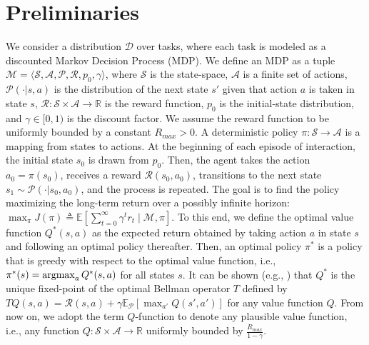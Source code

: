 \documentclass{article}
\newcommand{\argmax}{\operatornamewithlimits{argmax}}
\begin{document}
\section{Preliminaries}

We consider a distribution $\mathcal{D}$ over tasks, where each task is modeled as a discounted Markov Decision Process (MDP). We define an MDP as a tuple $\mathcal{M} = \langle \mathcal{S},\mathcal{A},\mathcal{P},\mathcal{R},p_0,\gamma\rangle$, where $\mathcal{S}$ is the state-space, $\mathcal{A}$ is a finite set of actions, $\mathcal{P}(\cdot | s,a)$ is the distribution of the next state $s'$ given that action $a$ is taken in state $s$, $\mathcal{R}: \mathcal{S}\times\mathcal{A}\rightarrow\mathbb{R}$ is the reward function, $p_0$ is the initial-state distribution, and $\gamma\in [0,1)$ is the discount factor. We assume the reward function to be uniformly bounded by a constant $R_{max}>0$. A deterministic policy $\pi : \mathcal{S} \rightarrow \mathcal{A}$ is a mapping from states to actions. At the beginning of each episode of interaction, the initial state $s_0$ is drawn from $p_0$. Then, the agent takes the action $a_0 = \pi(s_0)$, receives a reward $\mathcal{R}(s_0,a_0)$, transitions to the next state $s_1 \sim \mathcal{P}(\cdot | s_0,a_0)$, and the process is repeated. The goal is to find the policy maximizing the long-term return over a possibly infinite horizon: $\max_{\pi}J(\pi)\triangleq\mathbb{E}[\sum_{t=0}^{\infty} \gamma^t r_t \mid \mathcal{M},\pi]$. To this end, we define the optimal value function $Q^*(s,a)$ as the expected return obtained by taking action $a$ in state $s$ and following an optimal policy thereafter. Then, an optimal policy $\pi^*$ is a policy that is greedy with respect to the optimal value function, i.e., $\pi^*(s) = \argmax_a Q^*(s,a)$ for all states $s$. It can be shown (e.g., \cite{puterman1994markov}) that $Q^*$ is the unique fixed-point of the optimal Bellman operator $T$ defined by $TQ(s,a) = \mathcal{R}(s,a) + \gamma\mathbb{E}_{\mathcal{P}}[\max_{a'}Q(s',a')]$ for any value function $Q$. From now on, we adopt the term $Q$-function to denote any plausible value function, i.e., any function $Q : \mathcal{S}\times\mathcal{A} \rightarrow \mathbb{R}$ uniformly bounded by $\frac{R_{max}}{1-\gamma}$.
\end{document}
